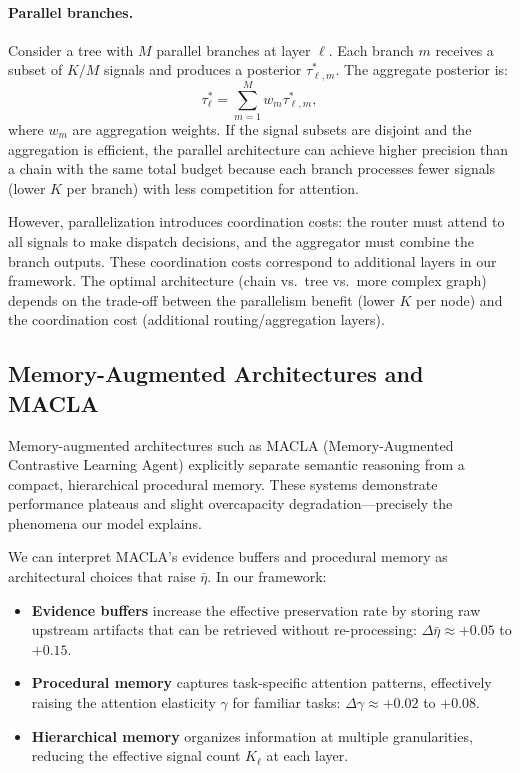 \paragraph{Parallel branches.} Consider a tree with $M$ parallel branches at layer $\ell$. Each branch $m$ receives a subset of $K/M$ signals and produces a posterior $\tau^*_{\ell,m}$. The aggregate posterior is:
\begin{equation}\label{eq:tree_posterior}
\tau^*_\ell = \sum_{m=1}^{M} w_m \tau^*_{\ell,m},
\end{equation}
where $w_m$ are aggregation weights. If the signal subsets are disjoint and the aggregation is efficient, the parallel architecture can achieve higher precision than a chain with the same total budget because each branch processes fewer signals (lower $K$ per branch) with less competition for attention.

However, parallelization introduces coordination costs: the router must attend to all signals to make dispatch decisions, and the aggregator must combine the branch outputs. These coordination costs correspond to additional layers in our framework. The optimal architecture (chain vs.~tree vs.~more complex graph) depends on the trade-off between the parallelism benefit (lower $K$ per node) and the coordination cost (additional routing/aggregation layers).

\subsection{Memory-Augmented Architectures and MACLA}
\label{subsec:macla}

Memory-augmented architectures such as MACLA (Memory-Augmented Contrastive Learning Agent) explicitly separate semantic reasoning from a compact, hierarchical procedural memory. These systems demonstrate performance plateaus and slight overcapacity degradation---precisely the phenomena our model explains.

We can interpret MACLA's evidence buffers and procedural memory as architectural choices that raise $\bar{\eta}$. In our framework:
\begin{itemize}
\item \textbf{Evidence buffers} increase the effective preservation rate by storing raw upstream artifacts that can be retrieved without re-processing: $\Delta \bar{\eta} \approx +0.05$ to $+0.15$.
\item \textbf{Procedural memory} captures task-specific attention patterns, effectively raising the attention elasticity $\gamma$ for familiar tasks: $\Delta \gamma \approx +0.02$ to $+0.08$.
\item \textbf{Hierarchical memory} organizes information at multiple granularities, reducing the effective signal count $K_\ell$ at each layer.
\end{itemize}

